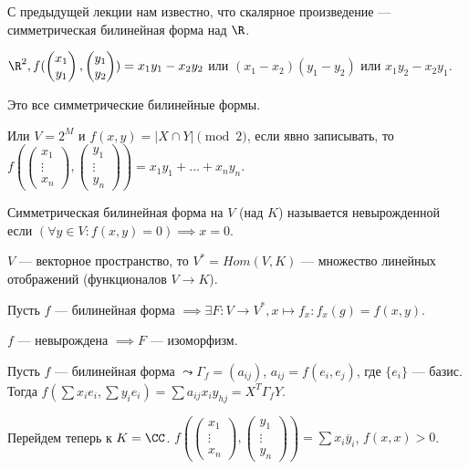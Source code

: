С предыдущей лекции нам известно, что скалярное произведение --- симметрическая билинейная форма над  $\R$.
\begin{example}
    $\R^2, f(\begin{pmatrix} x_1 \\ y_1 \end{pmatrix}, \begin{pmatrix} y_1 \\ y_2 \end{pmatrix}) =x_1y_1 - x_2y_2$ или $(x_1-x_2)(y_1-y_2)$ или $x_1y_2 - x_2y_1$.

    Это все симметрические билинейные формы. 

    Или $V=2^M$ и  $f(x,y) = | X \cap Y| \pmod 2$, если явно записывать, то  $f(\begin{pmatrix} x_1 \\ \vdots \\ x_n \end{pmatrix}, \begin{pmatrix} y_1 \\ \vdots \\ y_n \end{pmatrix}) = x_1y_1 + \ldots + x_ny_n$.
\end{example}
\begin{definition}
    Симметрическая билинейная форма на $V$ (над $K$) называется невырожденной если $(\forall y \in V: f(x, y) = 0) \implies x = 0$.
\end{definition}
\begin{definition}
    $V$ --- векторное пространство, то  $V^* = Hom(V, K)$ --- множество линейных отображений (функционалов $V \to K$).
\end{definition}

Пусть $f$ --- билинейная форма  $\implies \exists F\!: V \to V^*, x \mapsto f_x\!: f_x(g) = f(x, y)$.

$f$ --- невырождена $\implies F$ --- изоморфизм. 

Пусть $f$ --- билинейная форма  $\leadsto \Gamma_f = (a_{ij})$,  $a_{ij} = f(e_i, e_j)$, где  $\{e_i\}$ --- базис. Тогда  $f(\sum x_i e_i, \sum y_i e_i) = \sum a_{ij} x_i y_{hj} = X^T \Gamma_f Y$.

Перейдем теперь к $K = \CC$.  $f(\begin{pmatrix} x_1 \\ \vdots \\ x_n \end{pmatrix}, \begin{pmatrix} y_1 \\ \vdots \\ y_n \end{pmatrix}) = \sum x_i \overline{y}_i$, $f(x, x) > 0$.

